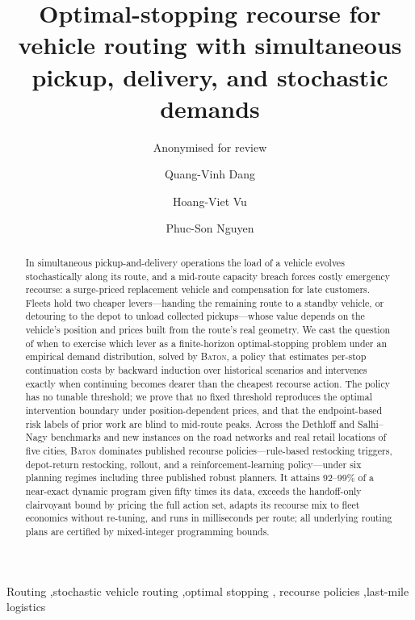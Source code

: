 \documentclass[preprint,authoryear,12pt]{elsarticle}
\theoremstyle{definition}
\theoremstyle{remark}
\begin{document}
\begin{frontmatter}

\title{Optimal-stopping recourse for vehicle routing with
simultaneous pickup, delivery, and stochastic demands}

\ifanon
  \author{Anonymised for review}
\else
  \author[buv]{Quang-Vinh Dang}
  \author[buv]{Hoang-Viet Vu}
  \author[ueh]{Phuc-Son Nguyen}
  \address[buv]{British University Vietnam, Hung Yen, Vietnam}
  \address[ueh]{UEH University, Ho Chi Minh City, Vietnam}
\fi

\begin{abstract}
In simultaneous pickup-and-delivery operations the load of a vehicle
evolves stochastically along its route, and a mid-route capacity breach
forces costly emergency recourse: a surge-priced replacement vehicle and
compensation for late customers. Fleets hold two cheaper
levers---handing the remaining route to a standby vehicle, or detouring
to the depot to unload collected pickups---whose value depends on the
vehicle's position and prices built from the route's real geometry. We
cast the question of when to exercise which lever as a finite-horizon
optimal-stopping problem under an empirical demand distribution, solved
by
\textsc{Baton}, a policy that estimates per-stop continuation costs by
backward induction over historical scenarios and intervenes exactly
when continuing becomes dearer than the cheapest recourse action. The
policy has no tunable threshold; we prove that no fixed threshold
reproduces the optimal intervention boundary under position-dependent
prices, and that the endpoint-based risk labels of prior work are
blind to mid-route peaks. Across the Dethloff and Salhi--Nagy
benchmarks and new instances on the road networks and real retail
locations of five cities, \textsc{Baton} dominates published recourse
policies---rule-based restocking triggers, depot-return restocking,
rollout, and a reinforcement-learning policy---under six planning
regimes including three published robust planners. It attains
92--99\% of a near-exact dynamic program given fifty times its data,
exceeds the handoff-only clairvoyant bound by pricing the full action
set, adapts its recourse mix to fleet economics without re-tuning, and
runs in milliseconds per route; all underlying routing plans are
certified by mixed-integer programming bounds.
\end{abstract}

\begin{keyword}
Routing \sep stochastic vehicle routing \sep optimal stopping \sep
recourse policies \sep last-mile logistics
\end{keyword}

\end{frontmatter}
\end{document}
